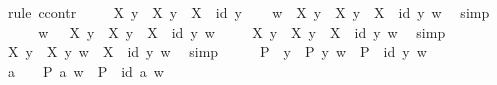 \begin{isabellebody}
%
\isadelimproof
%
\endisadelimproof
%
\isatagproof
{}\isamarkupfalse%
\ {\isacharparenleft}rule\ ccontr{\isacharparenright}\isanewline
\ \ \isamarkupfalse%
\ {\isachardoublequoteopen}{\isasymnot}\ {\isasymlfloor}\isactrlbold {\isasymforall}X\ y{\isachardot}\ {\isasymE}\ X\ y\ \isactrlbold {\isasymrightarrow}\ {\isacharparenleft}X\ {\isasymRrightarrow}\ {\isacharparenleft}id\ y{\isacharparenright}{\isacharparenright}{\isasymrfloor}{\isachardoublequoteclose}\isanewline
\ \ \isamarkupfalse%
\ {\isachardoublequoteopen}{\isasymexists}w{\isachardot}\ {\isasymnot}{\isacharparenleft}{\isacharparenleft}\ \isactrlbold {\isasymforall}X\ y{\isachardot}\ {\isasymE}\ X\ y\ \isactrlbold {\isasymrightarrow}\ X\ {\isasymRrightarrow}\ id\ y{\isacharparenright}\ w{\isacharparenright}{\isachardoublequoteclose}\ \isamarkupfalse%
\ simp\isanewline
\ \ \isamarkupfalse%
\ \isamarkupfalse%
\ w\ \ {\isachardoublequoteopen}{\isasymnot}{\isacharparenleft}{\isacharparenleft}\ \isactrlbold {\isasymforall}X\ y{\isachardot}\ {\isasymE}\ X\ y\ \isactrlbold {\isasymrightarrow}\ X\ {\isasymRrightarrow}\ id\ y{\isacharparenright}\ w{\isacharparenright}{\isachardoublequoteclose}\ \isacommand{{\isachardot}{\isachardot}}\isamarkupfalse%
\isanewline
\ \ \isamarkupfalse%
\ {\isachardoublequoteopen}{\isacharparenleft}\isactrlbold {\isasymexists}X\ y{\isachardot}\ {\isasymE}\ X\ y\ \isactrlbold {\isasymand}\ \isactrlbold {\isasymnot}{\isacharparenleft}X\ {\isasymRrightarrow}\ id\ y{\isacharparenright}{\isacharparenright}\ w{\isachardoublequoteclose}\ \isamarkupfalse%
\ simp\isanewline
\ \ \isamarkupfalse%
\ {\isachardoublequoteopen}{\isasymexists}X\ y{\isachardot}\ {\isasymE}\ X\ y\ w\ {\isasymand}\ {\isacharparenleft}\isactrlbold {\isasymnot}{\isacharparenleft}X\ {\isasymRrightarrow}\ id\ y{\isacharparenright}{\isacharparenright}\ w{\isachardoublequoteclose}\ \isamarkupfalse%
\ simp\isanewline
\ \ \isamarkupfalse%
\ \isamarkupfalse%
\ P\ \ {\isachardoublequoteopen}{\isasymexists}y{\isachardot}\ {\isasymE}\ P\ y\ w\ {\isasymand}\ {\isacharparenleft}\isactrlbold {\isasymnot}{\isacharparenleft}P\ {\isasymRrightarrow}\ id\ y{\isacharparenright}{\isacharparenright}\ w{\isachardoublequoteclose}\ \isacommand{{\isachardot}{\isachardot}}\isamarkupfalse%
\isanewline
\ \ \isamarkupfalse%
\ \isamarkupfalse%
\ a\ \ {}{\isacharcolon}\ {\isachardoublequoteopen}{\isasymE}\ P\ a\ w\ {\isasymand}\ {\isacharparenleft}\isactrlbold {\isasymnot}{\isacharparenleft}P\ {\isasymRrightarrow}\ id\ a{\isacharparenright}{\isacharparenright}\ w{\isachardoublequoteclose}\ \isacommand{{\isachardot}{\isachardot}}\isamarkupfalse%

\end{isabellebody}

